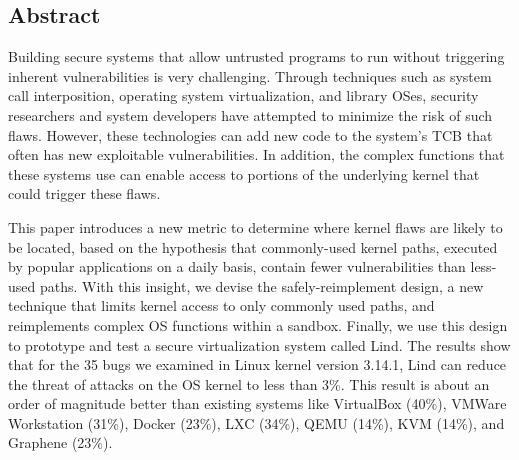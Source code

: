 \subsection*{Abstract}
Building secure systems that allow untrusted programs to run without
triggering inherent vulnerabilities %
is very challenging.
Through techniques such as system call interposition,
operating system virtualization, and library OSes, security researchers
and system developers have attempted to minimize the risk of such flaws.
However, these technologies can add new code to the system's TCB that often has new
exploitable vulnerabilities. 
In addition, the complex functions that these systems use can enable access
to portions of the underlying kernel that could trigger these flaws.

This paper introduces a new metric to determine where kernel flaws are
likely to be located, based on the  hypothesis that commonly-used kernel
paths, executed by popular applications on a daily basis, contain fewer
vulnerabilities than less-used paths. With this insight, we devise the
safely-reimplement design, a new technique that limits kernel access to only
commonly used paths, and reimplements complex OS functions within a sandbox. 
Finally, we use this design to prototype and test a secure virtualization system called Lind.
The results show that for the 35 bugs we examined in Linux kernel version 3.14.1, 
Lind can reduce the threat of attacks on the OS kernel to less than 3\%.
This result is about an order of magnitude better than existing systems like VirtualBox (40\%),
VMWare Workstation (31\%), Docker (23\%), LXC (34\%), QEMU (14\%), KVM (14\%), and Graphene (23\%).



